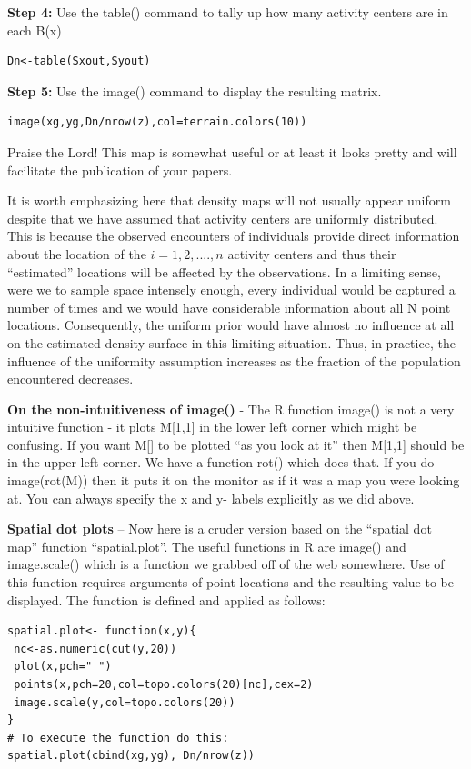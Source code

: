 {\flushleft \bf Step 4:} Use the table() command  to tally up how many activity centers are in each B(x) 
\begin{verbatim}
Dn<-table(Sxout,Syout)
\end{verbatim}

{\flushleft \bf Step 5:} Use the image() command to display the resulting matrix.
\begin{verbatim}
image(xg,yg,Dn/nrow(z),col=terrain.colors(10))
\end{verbatim}
Praise the Lord! This map is somewhat useful or at least it looks pretty and will facilitate the publication of your papers.

It is worth emphasizing here that density maps will not usually appear
uniform despite that we have assumed that activity centers are
uniformly distributed. This is because the observed encounters of
individuals provide direct information about the location of the
$i=1,2,....,n$ activity centers and thus their ``estimated'' locations
will be affected by the observations. In a limiting sense, were we to
sample space intensely enough, every individual would be captured a
number of times and we would have considerable information about all N
point locations. Consequently, the uniform prior would have almost no
influence at all on the estimated density surface in this limiting
situation. Thus, in practice, the influence of the uniformity
assumption increases as the fraction of the population encountered
decreases.

{\bf On the non-intuitiveness of image() }- The R function image() is not a very intuitive function - it plots M[1,1] in the lower left corner which might be confusing. If you want M[] to be plotted ``as you look at it'' then M[1,1] should be in the upper left corner.  We have a function rot() which does that. If you do image(rot(M)) then it puts it on the monitor as if it was a map you were looking at.  You can always specify the x and y- labels explicitly as we did above.

{\bf Spatial dot plots }-- Now here is a cruder version based on the
``spatial dot map'' function ``spatial.plot''.  The useful functions in R
are image() and image.scale() which is a function we grabbed off of
the web somewhere. Use of this function requires arguments of point
locations and the resulting value to be displayed. The function is
defined and applied as follows:

\begin{verbatim}
spatial.plot<- function(x,y){
 nc<-as.numeric(cut(y,20))
 plot(x,pch=" ")
 points(x,pch=20,col=topo.colors(20)[nc],cex=2)
 image.scale(y,col=topo.colors(20))
}
# To execute the function do this:
spatial.plot(cbind(xg,yg), Dn/nrow(z))
\end{verbatim}


